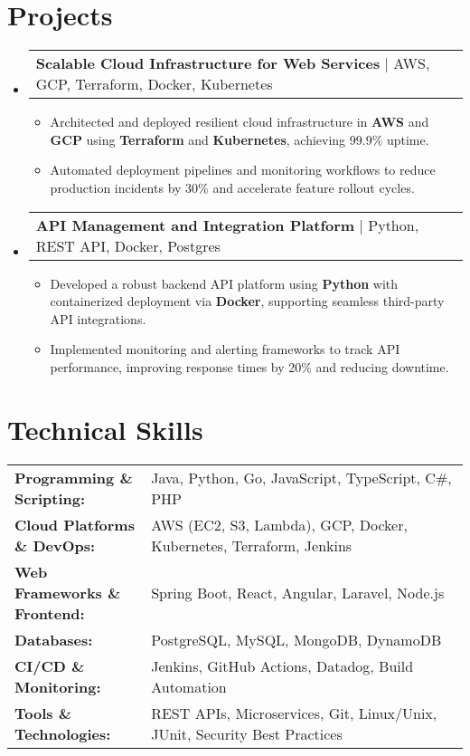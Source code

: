 \documentclass[letterpaper,11pt]{article}
\makeatletter
\newcommand{\resumeItem}[1]{
  \item\footnotesize{
    {#1 \vspace{-2pt}}
  }
}
\newcommand{\resumeProjectHeading}[2]{
    \item
    \begin{tabular*}{1.001\textwidth}{l@{\extracolsep{\fill}}r}
      \small#1 & \textbf{\small #2}\\
    \end{tabular*}\vspace{-7pt}
}
\newcommand{\resumeSubHeadingListStart}{\begin{itemize}[leftmargin=0pt, label={}]}
\newcommand{\resumeSubHeadingListEnd}{\end{itemize}}
\newcommand{\resumeItemListStart}{\begin{itemize}[leftmargin=*]}
\newcommand{\resumeItemListEnd}{\end{itemize}\vspace{-5pt}}
\makeatother
\begin{document}
\section{Projects}
    \vspace{-5pt}
    \resumeSubHeadingListStart
      \resumeProjectHeading
          {\textbf{Scalable Cloud Infrastructure for Web Services} | AWS, GCP, Terraform, Docker, Kubernetes}{}
          \resumeItemListStart
              \resumeItem{Architected and deployed resilient cloud infrastructure in \textbf{AWS} and \textbf{GCP} using \textbf{Terraform} and \textbf{Kubernetes}, achieving 99.9\% uptime.}
              \resumeItem{Automated deployment pipelines and monitoring workflows to reduce production incidents by 30\% and accelerate feature rollout cycles.}
          \resumeItemListEnd
          \vspace{-16pt}
      \resumeProjectHeading
          {\textbf{API Management and Integration Platform} | Python, REST API, Docker, Postgres}{}
          \resumeItemListStart
              \resumeItem{Developed a robust backend API platform using \textbf{Python} with containerized deployment via \textbf{Docker}, supporting seamless third-party API integrations.}
              \resumeItem{Implemented monitoring and alerting frameworks to track API performance, improving response times by 20\% and reducing downtime.}
          \resumeItemListEnd
          \vspace{-16pt}
    \resumeSubHeadingListEnd
\vspace{-10pt}
\section{Technical Skills}
        \vspace{-14pt}
        \begin{table}[h]
            \footnotesize
            \begin{tabular}{p{0.3\linewidth} p{0.7\linewidth}}
                \textbf{Programming \& Scripting:} & Java, Python, Go, JavaScript, TypeScript, C\#, PHP \\
                \textbf{Cloud Platforms \& DevOps:} & AWS (EC2, S3, Lambda), GCP, Docker, Kubernetes, Terraform, Jenkins \\
                \textbf{Web Frameworks \& Frontend:} & Spring Boot, React, Angular, Laravel, Node.js \\
                \textbf{Databases:} & PostgreSQL, MySQL, MongoDB, DynamoDB \\
                \textbf{CI/CD \& Monitoring:} & Jenkins, GitHub Actions, Datadog, Build Automation \\
                \textbf{Tools \& Technologies:} & REST APIs, Microservices, Git, Linux/Unix, JUnit, Security Best Practices \\
            \end{tabular}
        \end{table}
\end{document}
